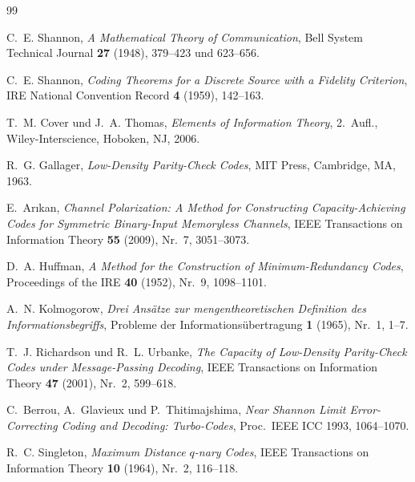 \documentclass[12pt,a4paper]{amsart}
\theoremstyle{definition}
\theoremstyle{remark}
\begin{document}
\begin{thebibliography}{99}

C.~E. Shannon,
\emph{A Mathematical Theory of Communication},
Bell System Technical Journal \textbf{27} (1948), 379--423 und 623--656.

C.~E. Shannon,
\emph{Coding Theorems for a Discrete Source with a Fidelity Criterion},
IRE National Convention Record \textbf{4} (1959), 142--163.

T.~M. Cover und J.~A. Thomas,
\emph{Elements of Information Theory}, 2.\ Aufl.,
Wiley-Interscience, Hoboken, NJ, 2006.

R.~G. Gallager,
\emph{Low-Density Parity-Check Codes},
MIT Press, Cambridge, MA, 1963.

E.~Ar\i{}kan,
\emph{Channel Polarization: A Method for Constructing Capacity-Achieving Codes
for Symmetric Binary-Input Memoryless Channels},
IEEE Transactions on Information Theory \textbf{55} (2009), Nr.~7, 3051--3073.

D.~A. Huffman,
\emph{A Method for the Construction of Minimum-Redundancy Codes},
Proceedings of the IRE \textbf{40} (1952), Nr.~9, 1098--1101.

A.~N. Kolmogorow,
\emph{Drei Ansätze zur mengentheoretischen Definition des Informationsbegriffs},
Probleme der Informationsübertragung \textbf{1} (1965), Nr.~1, 1--7.

T.~J. Richardson und R.~L. Urbanke,
\emph{The Capacity of Low-Density Parity-Check Codes under Message-Passing
Decoding},
IEEE Transactions on Information Theory \textbf{47} (2001), Nr.~2, 599--618.

C.~Berrou, A.~Glavieux und P.~Thitimajshima,
\emph{Near Shannon Limit Error-Correcting Coding and Decoding: Turbo-Codes},
Proc.\ IEEE ICC 1993, 1064--1070.

R.~C. Singleton,
\emph{Maximum Distance $q$-nary Codes},
IEEE Transactions on Information Theory \textbf{10} (1964), Nr.~2, 116--118.

\end{thebibliography}
\end{document}
